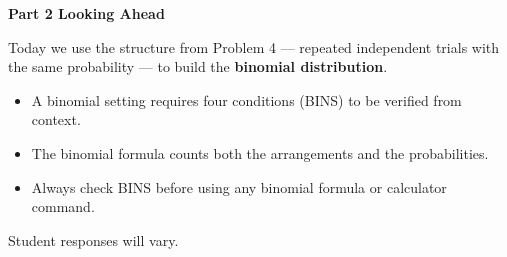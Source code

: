 \documentclass[10pt]{article}
\begin{document}
\vspace{0.2in}

{\large\bfseries\color{navy} Part 2 \quad Looking Ahead}

\vspace{0.12in}

\noindent Today we use the structure from Problem 4 --- repeated independent trials
with the same probability --- to build the \textbf{binomial distribution}.

\vspace{0.14in}

\begin{tcolorbox}[colback=greenbg, colframe=greenacc, boxrule=0.8pt, arc=2mm,
    left=4mm, right=4mm, top=3mm, bottom=3mm]
    \small
    \begin{itemize}[leftmargin=1.3em, itemsep=8pt]
  \item A binomial setting requires four conditions (BINS) to be verified from context.
  \item The binomial formula counts both the arrangements and the probabilities.
  \item Always check BINS before using any binomial formula or calculator command.
    \end{itemize}
\end{tcolorbox}

\vspace{0.18in}

\noindent\textcolor{slate}{\small Student responses will vary.}
\end{document}
